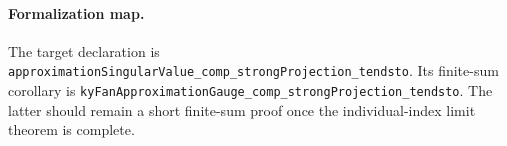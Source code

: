 \paragraph{Formalization map.}
The target declaration is
\texttt{approximationSingularValue\_comp\_strongProjection\_tendsto}.
Its finite-sum corollary is
\texttt{kyFanApproximationGauge\_comp\_strongProjection\_tendsto}.
The latter should remain a short finite-sum proof once the individual-index
limit theorem is complete.

